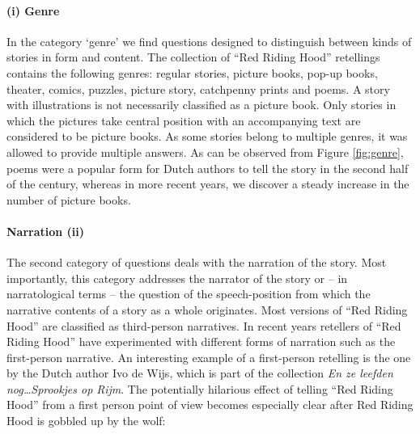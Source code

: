 \paragraph{(i) Genre} In the category `genre' we find questions designed to distinguish between kinds of stories in form and content. The collection of ``Red Riding Hood'' retellings contains the following genres: regular stories, picture books, pop-up books, theater, comics, puzzles, picture story, catchpenny prints and poems. A story with illustrations is not necessarily classified as a picture book. Only stories in which the pictures take central position with an accompanying text are considered to be picture books. As some stories belong to multiple genres, it was allowed to provide multiple answers. As can be observed from Figure \ref{fig:genre}, poems were a popular form for Dutch authors to tell the story in the second half of the  century, whereas in more recent years, we discover a steady increase in the number of picture books. 

\paragraph{Narration (ii)} The second category of questions deals with the narration of the story. Most importantly, this category addresses the narrator of the story or -- in narratological terms -- the question of the speech-position from which the narrative contents of a story as a whole originates. Most versions of ``Red Riding Hood'' are classified as third-person narratives. In recent years retellers of ``Red Riding Hood'' have experimented with different forms of narration such as the first-person narrative. An interesting example of a first-person retelling is the one by the Dutch author Ivo de Wijs, which is part of the collection \emph{En ze leefden nog\ldots Sprookjes op Rijm}\autocite{wijs:2011}. The potentially hilarious effect of telling ``Red Riding Hood'' from a first person point of view becomes especially clear after Red Riding Hood is gobbled up by the wolf:

